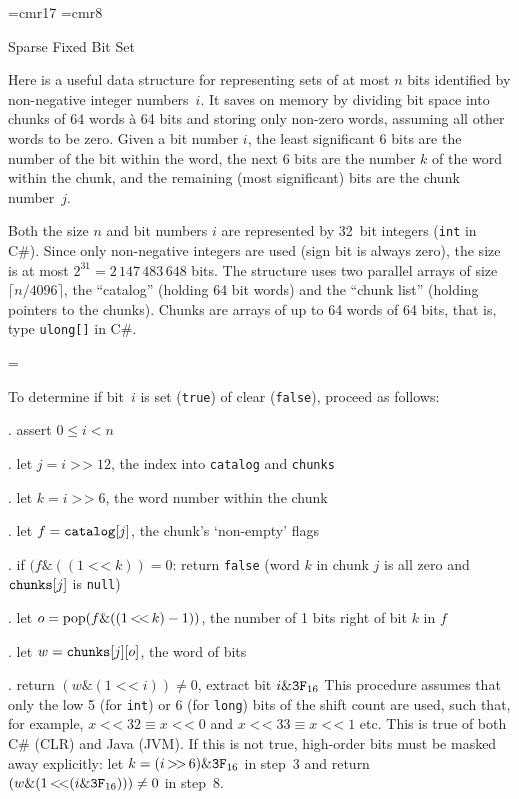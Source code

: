 
\magnification\magstephalf
\nopagenumbers
\font\tf=cmr17
\font\sf=cmr8
\def\shr{\mathop{>\!>}}
\def\shl{\mathop{<\!<}}
\def\pop{\mathord{\rm pop}}

\centerline{\tf Sparse Fixed Bit Set}
\bigskip
\noindent
Here is a useful data structure for representing sets of at most
$n$ bits identified by non-negative integer numbers~$i$. It saves
on memory by dividing bit space into chunks of 64 words \`a 64 bits
and storing only non-zero words, assuming all other words to be zero.
Given a bit number $i$, the least significant 6 bits are the number
of the bit within the word, the next 6 bits are the number $k$ of the
word within the chunk, and the remaining (most significant) bits are the
chunk number~$j$.
\smallskip
\centerline{}
\smallskip
\noindent
Both the size $n$ and bit numbers $i$ are represented by 32~bit integers
({\tt int} in C\#). Since only non-negative integers are used (sign bit
is always zero), the size is at most $2^{31}=2\,147\,483\,648$ bits.
The structure uses two parallel arrays of size $\lceil n/4096\rceil$,
the ``catalog'' (holding 64 bit words) and the ``chunk list'' (holding
pointers to the chunks). Chunks are arrays of up to 64 words of 64 bits,
that is, type {\tt ulong[]} in C\#.
\medskip
\centerline{\epsfxsize=\hsize{}}
\medskip
\noindent
To determine if bit~$i$ is set ({\tt true}) of clear ({\tt false}),
proceed as follows:
\smallskip
\item{.} assert $0\le i<n$
\item{.} let $j=i\shr12$, the index into {\tt catalog} and {\tt chunks}
\item{.} let $k=i\shr6$, the word number within the chunk
\item{.} let $f={\tt catalog}[j]$, the chunk's `non-empty' flags
\item{.} if $(f\&((1\shl k))=0$: return {\tt false} (word $k$ in chunk $j$ is all zero and ${\tt chunks}[j]$ is {\tt null})
\item{.} let $o=\pop(f\&((1\shl k)-1))$, the number of 1 bits right of bit $k$ in $f$
\item{.} let $w={\tt chunks}[j][o]$, the word of bits
\item{.} return $(w\&(1\shl i))\not=0$, extract bit $i\&{\tt 3F}_{16}$
\smallskip
\noindent
This procedure assumes that only the low 5 (for {\tt int}) or
6 (for {\tt long}) bits of the shift count are used, such that,
for example, $x\shl32\equiv x\shl0$ and $x\shl33\equiv x\shl1$
etc. This is true of both C\# (CLR) and Java (JVM).
If this is not true, high-order bits must be masked away explicitly:
let $k=(i\shr6)\&{\tt 3F}_{16}$ in step~3 and
return $(w\&(1\shl(i\&{\tt 3F}_{16})))\not=0$ in step~8.

